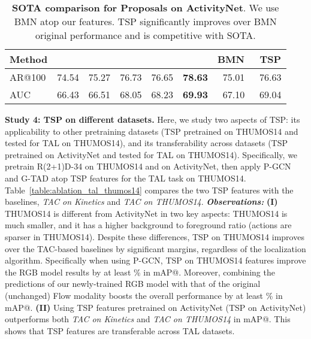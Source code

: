 \documentclass[10pt,twocolumn,letterpaper]{article}
\begin{document}
\begin{table}[t!]
    \small
    \centering
    \tabcolsep=0.1cm
    \caption{\textbf{SOTA comparison for Proposals on ActivityNet}. We use BMN atop our features. TSP significantly improves over BMN original performance and is competitive with SOTA.}
    \vspace{-6pt}
    \begin{tabular}{l|ccccc|cc}
    \toprule
 Method  & \cite{mgg}   & \cite{zhao2020bottom} & \cite{bcgcn} & \cite{dbg} & \cite{gao2020accurate} & BMN~\cite{Lin_2019_ICCV}  &\bf TSP \\\midrule
 \footnotesize AR@100  & 74.54            & 75.27                            & 76.73              & 76.65          &\bf78.63                       & 75.01          &   76.63 \\
\rowcolor{Gray}
 AUC & 66.43            & 66.51                            & 68.05              & 68.23          &\bf69.93                       & 67.10          &   69.04 \\
    \bottomrule
    \end{tabular}
    \label{table:sota_proposals}
\end{table}
 \vspace{3pt}\noindent\textbf{Study 4: TSP on different datasets.}
Here, we study two aspects of TSP: its applicability to other pretraining datasets (\ie TSP pretrained on THUMOS14 and tested for TAL on THUMOS14), and its transferability across datasets (\ie TSP pretrained on ActivityNet and tested for TAL on THUMOS14).
Specifically, we pretrain R(2+1)D-34 on THUMOS14 and on ActivityNet, then apply P-GCN and G-TAD atop TSP features for the TAL task on THUMOS14. Table~\ref{table:ablation_tal_thumos14} compares the two TSP features with the baselines, \textit{TAC on Kinetics} and \textit{TAC on THUMOS14}.
\textit{\textbf{Observations:}}
\textbf{(I)} THUMOS14 is different from ActivityNet in two key aspects: THUMOS14 is much smaller, and it has a higher background to foreground ratio (\ie actions are sparser in THUMOS14). Despite these differences, TSP on THUMOS14 improves over the TAC-based baselines by significant margins, regardless of the localization algorithm. Specifically when using P-GCN, TSP on THUMOS14 features improve the RGB model results by at least \% in mAP@. Moreover, combining the predictions of our newly-trained RGB model with that of the original (unchanged) Flow modality boosts the overall performance by at least \% in mAP@.
\textbf{(II)} Using TSP features pretrained on ActivityNet (TSP on ActivityNet) outperforms both \textit{TAC on Kinetics} and \textit{TAC on THUMOS14} in mAP@. This shows that TSP features are transferable across TAL datasets.
\end{document}
